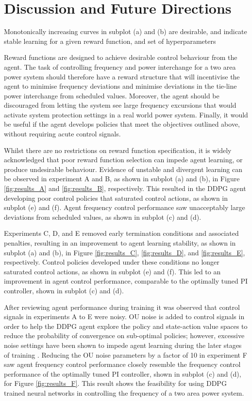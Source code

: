 \chapter{Discussion and Future Directions}

Monotonically increasing curves in subplot (a) and (b) are desirable, and indicate stable learning for a given reward function, and set of hyperparameters

Reward functions are designed to achieve desirable control behaviour from the agent. The task of controlling frequency and power interchange for a two area power system should therefore have a reward structure that will incentivise the agent to minimise frequency deviations and minimise deviations in the tie-line power interchange from scheduled values. Moreover, the agent should be discouraged from letting the system see large frequency excursions that would activate system protection settings in a real world power system. Finally, it would be useful if the agent develops policies that meet the objectives outlined above, without requiring acute control signals.

Whilst there are no restrictions on reward function specification, it is widely acknowledged that poor reward function selection can impede agent learning, or produce undesirable behaviour. Evidence of unstable and divergent learning can be observed in experiment A and B, as shown in subplot (a) and (b), in Figure \ref{fig:results_A} and \ref{fig:results_B}, respectively. This resulted in the DDPG agent developing poor control policies that saturated control actions, as shown in subplot (e) and (f). Agent frequency control performance saw unacceptably large deviations from scheduled values, as shown in subplot (c) and (d).

Experiments C, D, and E removed early termination conditions and associated penalties, resulting in an improvement to agent learning stability, as shown in subplot (a) and (b), in Figure \ref{fig:results_C}, \ref{fig:results_D}, and \ref{fig:results_E}, respectively. Control policies developed under these conditions no longer saturated control actions, as shown in subplot (e) and (f). This led to an improvement in agent control performance, comparable to the optimally tuned PI controller, shown in subplot (c) and (d).

After reviewing agent performance during training it was observed that control signals in experiments A to E were noisy. OU noise is added to control signals in order to help the DDPG agent explore the policy and state-action value spaces to reduce the probability of convergence on sub-optimal policies; however, excessive noise settings have been shown to impede agent learning during the later stages of training \cite{}. Reducing the OU noise parameters by a factor of 10 in experiment F saw agent frequency control performance closely resemble the frequency control performance of the optimally tuned PI controller, shown in subplot (c) and (d), for Figure \ref{fig:results_F}. This result shows the feasibility for using DDPG trained neural networks in controlling the frequency of a two area power system.

